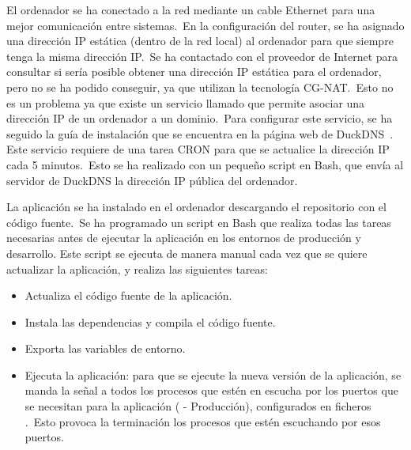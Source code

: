 El ordenador se ha conectado a la red mediante un cable Ethernet para una mejor comunicación entre sistemas.\
En la configuración del router, se ha asignado una dirección IP estática (dentro de la red local) al
ordenador para que siempre tenga la misma dirección IP.\ Se ha contactado con el proveedor de Internet para consultar
si sería posible obtener una dirección IP estática para el ordenador, pero no se ha podido conseguir, ya que
utilizan la tecnología CG-NAT.\ Esto no es un problema ya que existe un servicio llamado \boldFont{DuckDNS} que permite
asociar una dirección IP de un ordenador a un dominio.\ Para configurar este servicio, se ha seguido la guía de
instalación que se encuentra en la página web de DuckDNS~\cite{DuckDNSi96:online}.
Este servicio requiere de una tarea CRON para que se actualice la dirección IP cada 5 minutos.\ Esto se ha realizado con
un pequeño script en Bash, que envía al servidor de DuckDNS la dirección IP pública del ordenador.


La aplicación se ha instalado en el ordenador descargando el repositorio con el código fuente.\ Se ha programado un
script
en Bash que realiza todas las tareas necesarias antes de ejecutar la aplicación en los entornos de producción y
desarrollo.
Este script se ejecuta de manera manual cada vez que se quiere actualizar la aplicación, y realiza las siguientes
tareas:
\begin{itemize}
	\item Actualiza el código fuente de la aplicación.
	\item Instala las dependencias y compila el código fuente.
	\item Exporta las variables de entorno.
	\item Ejecuta la aplicación: para que se ejecute la nueva versión de la aplicación, se manda la señal
	\monoFont{TERM} a todos los procesos que estén en escucha por los puertos que se necesitan para la
	aplicación (\boldFont{4040} - Producción), configurados en ficheros \monoFont{.env}.\ Esto provoca la terminación
	los procesos que estén escuchando por esos puertos.
\end{itemize}
\label{itm:script_tasks}

